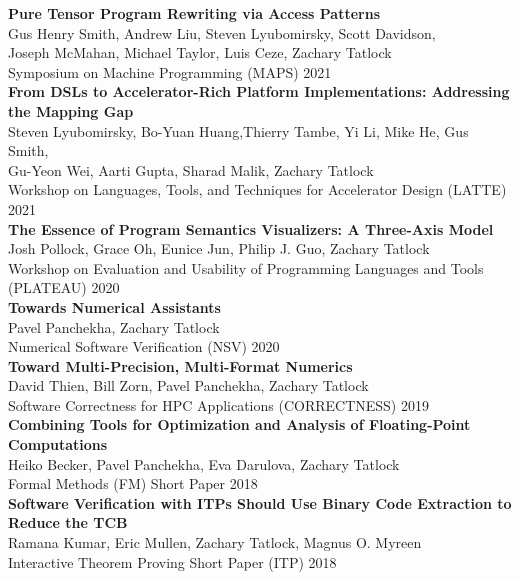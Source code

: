 \documentclass[10pt]{article}
\begin{document}
\textbf{%
Pure Tensor Program Rewriting via Access Patterns
} \\
Gus Henry Smith, Andrew Liu, Steven Lyubomirsky, Scott Davidson, \\
Joseph McMahan, Michael Taylor, Luis Ceze, Zachary Tatlock \\
Symposium on Machine Programming (MAPS) 2021 \\

\textbf{%
From DSLs to Accelerator-Rich Platform Implementations:
Addressing the Mapping Gap
} \\
Steven Lyubomirsky, Bo-Yuan Huang,Thierry Tambe, Yi Li, Mike He, Gus Smith, \\
Gu-Yeon Wei, Aarti Gupta, Sharad Malik, Zachary Tatlock \\
Workshop on Languages, Tools, and Techniques for
Accelerator Design (LATTE) 2021 \\

\textbf{%
  The Essence of Program Semantics Visualizers: A Three-Axis Model
} \\
Josh Pollock, Grace Oh, Eunice Jun, Philip J. Guo, Zachary Tatlock \\
Workshop on Evaluation and Usability of Programming Languages and Tools (PLATEAU) 2020 \\

\textbf{%
  Towards Numerical Assistants
} \\
Pavel Panchekha, Zachary Tatlock \\
Numerical Software Verification (NSV) 2020 \\

\textbf{%
Toward Multi-Precision, Multi-Format Numerics
} \\
David Thien, Bill Zorn, Pavel Panchekha, Zachary Tatlock \\
Software Correctness for HPC Applications (CORRECTNESS) 2019 \\

\textbf{%
Combining Tools for Optimization and Analysis of Floating-Point Computations
} \\
Heiko Becker, Pavel Panchekha, Eva Darulova, Zachary Tatlock \\
Formal Methods (FM) Short Paper 2018 \\

\textbf{%
Software Verification with ITPs Should Use Binary Code Extraction to Reduce the TCB
} \\
Ramana Kumar, Eric Mullen, Zachary Tatlock, Magnus O. Myreen \\
Interactive Theorem Proving Short Paper (ITP) 2018 \\
\end{document}
